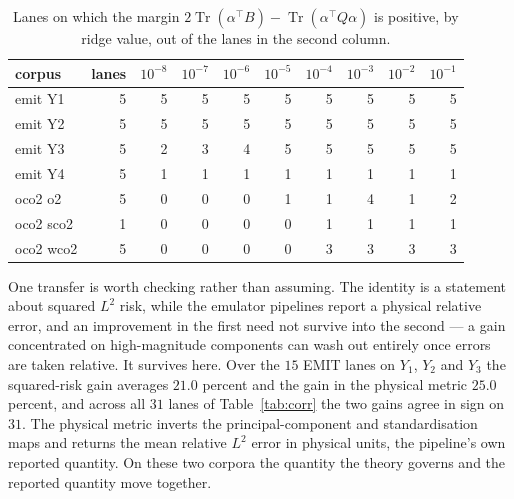 \documentclass[11pt]{article}
\theoremstyle{definition}
\DeclareMathOperator{\Tr}{Tr}
\newcommand{\numEmitGainLanes}{15}
\newcommand{\numEmitPhysGain}{25.0}
\newcommand{\numEmitSqGain}{21.0}
\newcommand{\numSignAgree}{31}
\newcommand{\numSignTot}{31}
\begin{document}
\begin{table}[t]
\centering\small
\caption{Lanes on which the margin $2\Tr(\alpha^\top B)-\Tr(\alpha^\top Q\alpha)$ is positive, by
ridge value, out of the lanes in the second column.}
\label{tab:signs}
\begin{tabular}{lrrrrrrrrr}
\toprule
corpus & lanes & $10^{-8}$ & $10^{-7}$ & $10^{-6}$ & $10^{-5}$ & $10^{-4}$ & $10^{-3}$ &
$10^{-2}$ & $10^{-1}$\\
\midrule
emit Y1 & 5 & 5 & 5 & 5 & 5 & 5 & 5 & 5 & 5\\
emit Y2 & 5 & 5 & 5 & 5 & 5 & 5 & 5 & 5 & 5\\
emit Y3 & 5 & 2 & 3 & 4 & 5 & 5 & 5 & 5 & 5\\
emit Y4 & 5 & 1 & 1 & 1 & 1 & 1 & 1 & 1 & 1\\
oco2 o2 & 5 & 0 & 0 & 0 & 1 & 1 & 4 & 1 & 2\\
oco2 sco2 & 1 & 0 & 0 & 0 & 0 & 1 & 1 & 1 & 1\\
oco2 wco2 & 5 & 0 & 0 & 0 & 0 & 3 & 3 & 3 & 3\\
\bottomrule
\end{tabular}
\end{table}

One transfer is worth checking rather than assuming. The identity is a statement about squared
$L^2$ risk, while the emulator pipelines report a physical relative error, and an improvement in the
first need not survive into the second --- a gain concentrated on high-magnitude components can wash
out entirely once errors are taken relative. It survives here. Over the $\numEmitGainLanes$ EMIT
lanes on $Y_1$, $Y_2$ and $Y_3$ the squared-risk gain averages $\numEmitSqGain$ percent and the gain
in the physical metric $\numEmitPhysGain$ percent, and across all $\numSignTot$ lanes of
Table~\ref{tab:corr} the two gains agree in sign on $\numSignAgree$. The physical metric inverts the
principal-component and standardisation maps and returns the mean relative $L^2$ error in physical
units, the pipeline's own reported quantity. On these two corpora the quantity the theory governs
and the reported quantity move together.
\end{document}
